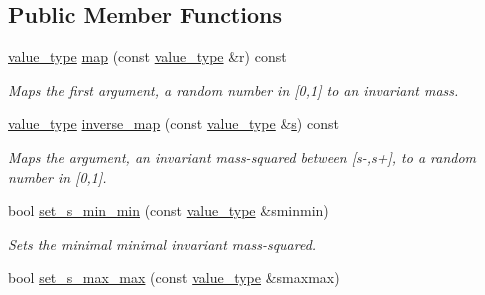 \subsection*{Public Member Functions}
\begin{DoxyCompactItemize}
\item 
\hyperlink{a00362_a3353150105036deac9bde097cbf1d8af}{value\-\_\-type} \hyperlink{a00001_aadb3d820ccaa228ffc634b81bc7f241f}{map} (const \hyperlink{a00362_a3353150105036deac9bde097cbf1d8af}{value\-\_\-type} \&r) const 
\begin{DoxyCompactList}\small\item\em Maps the first argument, a random number in \mbox{[}0,1\mbox{]} to an invariant mass. \end{DoxyCompactList}\item 
\hyperlink{a00362_a3353150105036deac9bde097cbf1d8af}{value\-\_\-type} \hyperlink{a00001_a522ceda7cca83a47f3b11178374d9749}{inverse\-\_\-map} (const \hyperlink{a00362_a3353150105036deac9bde097cbf1d8af}{value\-\_\-type} \&\hyperlink{a00482_a8bf50336c0da12a27a71eb1154a7012e}{s}) const 
\begin{DoxyCompactList}\small\item\em Maps the argument, an invariant mass-\/squared between \mbox{[}s-\/,s+\mbox{]}, to a random number in \mbox{[}0,1\mbox{]}. \end{DoxyCompactList}\item 
\hypertarget{a00001_a0c3524e9265bc0c1f09d7471a8e1ccb6}{bool \hyperlink{a00001_a0c3524e9265bc0c1f09d7471a8e1ccb6}{set\-\_\-s\-\_\-min\-\_\-min} (const \hyperlink{a00362_a3353150105036deac9bde097cbf1d8af}{value\-\_\-type} \&sminmin)}\label{a00001_a0c3524e9265bc0c1f09d7471a8e1ccb6}

\begin{DoxyCompactList}\small\item\em Sets the minimal minimal invariant mass-\/squared. \end{DoxyCompactList}\item 
\hypertarget{a00001_a6b7d84fb28397191ebbdb0b8a72be83a}{bool \hyperlink{a00001_a6b7d84fb28397191ebbdb0b8a72be83a}{set\-\_\-s\-\_\-max\-\_\-max} (const \hyperlink{a00362_a3353150105036deac9bde097cbf1d8af}{value\-\_\-type} \&smaxmax)}\label{a00001_a6b7d84fb28397191ebbdb0b8a72be83a}


\end{DoxyCompactItemize}
